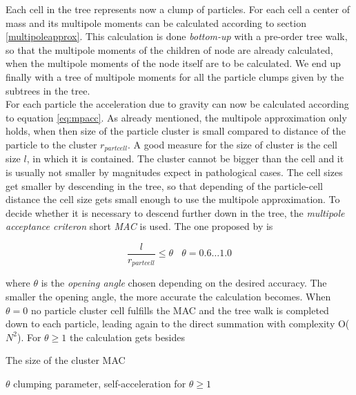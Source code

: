 Each cell in the tree represents now a clump of particles. For each cell a center of mass and its multipole moments can be calculated according to section \ref{multipoleapprox}. This calculation is done \emph{bottom-up} with a pre-order tree walk, so that the multipole moments of the children of node are already calculated, when the multipole moments of the node itself are to be calculated. We end up finally with a tree of multipole moments for all the particle clumps given by the subtrees in the tree.\\

For each particle the acceleration due to gravity can now be calculated according to equation \ref{eq:mpacc}. As already mentioned, the multipole approximation only holds, when then size of the particle cluster is small compared to distance of the particle to the cluster $r_{part cell}$. A good measure for the size of cluster is the cell size $l$, in which it is contained. The cluster cannot be bigger than the cell and it is usually not smaller by magnitudes expect in pathological cases. The cell sizes get smaller by descending in the tree, so that depending of the particle-cell distance the cell size gets small enough to use the multipole approximation. To decide whether it is necessary to descend further down in the tree, the \emph{multipole acceptance criteron} short \emph{MAC} is used. The one proposed by \cite{1986Natur.324..446B} is

\begin{equation}
\frac{l}{r_{part cell}} \le \theta ~~~~ \theta = 0.6 \dots 1.0
\end{equation}

where $\theta$ is the \emph{opening angle} chosen depending on the desired accuracy. The smaller the opening angle, the more accurate the calculation becomes. When $\theta = 0$ no particle cluster cell fulfills the MAC and the tree walk is completed down to each particle, leading again to the  direct summation with complexity O($N^2$). For $\theta \ge 1$ the calculation gets besides 

The size of the cluster 
MAC 

$\theta$ clumping parameter, self-acceleration for $\theta \ge 1$

